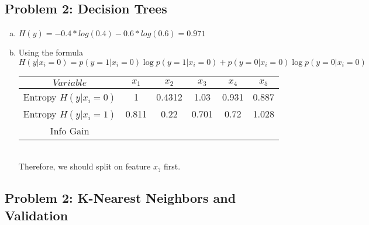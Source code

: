 \documentclass[twoside,11pt]{article}
\theoremstyle{definition}
\begin{document}

\subsection*{Problem 2: Decision Trees}

\begin{enumerate}[(a)]

\item $H(y) = - 0.4 * log(0.4) - 0.6*log(0.6) = 0.971$

\item Using the formula $H(y|x_i = 0) = p(y=1 | x_i = 0) \log p(y=1 | x_i = 0) + p(y=0 | x_i = 0) \log p(y=0 | x_i = 0)$
\begin{tabular}{|c|c|c|c|c|c|}\hline
$Variable$ & $x_1$ & $x_2$ & $x_3$ & $x_4$ & $x_5$ \\
\hline
Entropy $H(y|x_i = 0)$ & 1 & 0.4312 & 1.03 & 0.931 & 0.887 \\
\hline
Entropy $H(y|x_i = 1)$ & 0.811 & 0.22 & 0.701 & 0.72 & 1.028 \\
\hline
Info Gain &  \\
\hline
\end{tabular}
\\ Therefore, we should split on feature $x_?$ first.

\end{enumerate}


\subsection*{Problem 2: K-Nearest Neighbors and Validation}
\end{document}
